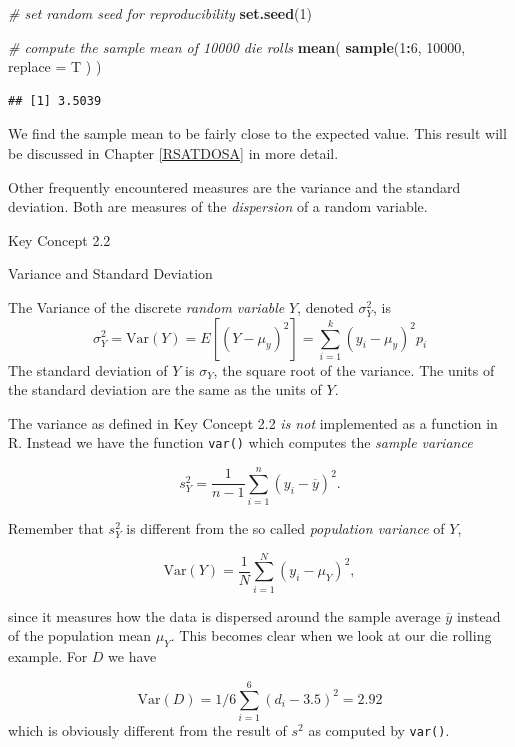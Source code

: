 \documentclass[]{book}
\newenvironment{Shaded}{\begin{snugshade}}{\end{snugshade}}
\newcommand{\KeywordTok}[1]{\textcolor[rgb]{0.13,0.29,0.53}{\textbf{#1}}}
\newcommand{\DataTypeTok}[1]{\textcolor[rgb]{0.13,0.29,0.53}{#1}}
\newcommand{\DecValTok}[1]{\textcolor[rgb]{0.00,0.00,0.81}{#1}}
\newcommand{\CommentTok}[1]{\textcolor[rgb]{0.56,0.35,0.01}{\textit{#1}}}
\newcommand{\OperatorTok}[1]{\textcolor[rgb]{0.81,0.36,0.00}{\textbf{#1}}}
\newcommand{\NormalTok}[1]{#1}
\theoremstyle{definition}
\theoremstyle{definition}
\theoremstyle{definition}
\theoremstyle{remark}
\begin{document}
\begin{Shaded}
\begin{Highlighting}[]
\CommentTok{# set random seed for reproducibility}
\KeywordTok{set.seed}\NormalTok{(}\DecValTok{1}\NormalTok{)}

\CommentTok{# compute the sample mean of 10000 die rolls}
\KeywordTok{mean}\NormalTok{(}
    \KeywordTok{sample}\NormalTok{(}\DecValTok{1}\OperatorTok{:}\DecValTok{6}\NormalTok{, }
           \DecValTok{10000}\NormalTok{, }
           \DataTypeTok{replace =}\NormalTok{ T}
\NormalTok{           )}
\NormalTok{    )}
\end{Highlighting}
\end{Shaded}

\begin{verbatim}
## [1] 3.5039
\end{verbatim}

We find the sample mean to be fairly close to the expected value. This
result will be discussed in Chapter \ref{RSATDOSA} in more detail.

Other frequently encountered measures are the variance and the standard
deviation. Both are measures of the \emph{dispersion} of a random
variable.

Key Concept 2.2

Variance and Standard Deviation

The Variance of the discrete \emph{random variable} \(Y\), denoted
\(\sigma^2_Y\), is
\[ \sigma^2_Y = \text{Var}(Y) = E\left[(Y-\mu_y)^2\right] = \sum_{i=1}^k (y_i - \mu_y)^2 p_i \]
The standard deviation of \(Y\) is \(\sigma_Y\), the square root of the
variance. The units of the standard deviation are the same as the units
of \(Y\).

The variance as defined in Key Concept 2.2 \emph{is not} implemented as
a function in R. Instead we have the function \texttt{var()} which
computes the \emph{sample variance}

\[ s^2_Y = \frac{1}{n-1} \sum_{i=1}^n (y_i - \overline{y})^2. \]

Remember that \(s^2_Y\) is different from the so called \emph{population
variance} of \(Y\),

\[ \text{Var}(Y) = \frac{1}{N} \sum_{i=1}^N (y_i - \mu_Y)^2, \]

since it measures how the data is dispersed around the sample average
\(\overline{y}\) instead of the population mean \(\mu_Y\). This becomes
clear when we look at our die rolling example. For \(D\) we have

\[ \text{Var}(D) = 1/6 \sum_{i=1}^6 (d_i - 3.5)^2 = 2.92  \] which is
obviously different from the result of \(s^2\) as computed by
\texttt{var()}.
\end{document}
